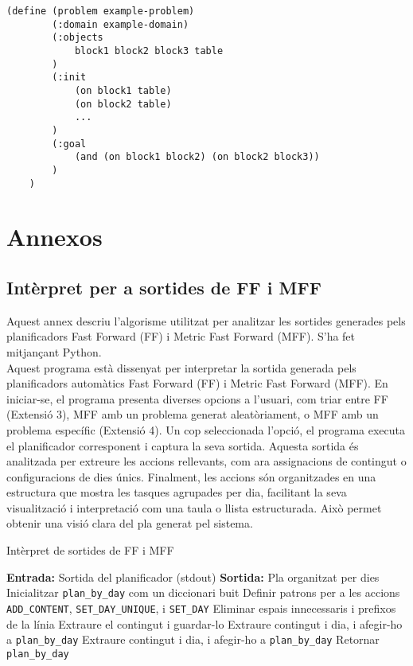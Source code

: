 \documentclass[a4paper]{article}
\begin{document}
	\begin{lstlisting}[language=PDDL, caption={Especificació del problema en PDDL}, label={lst:problemaPDDL}]
	(define (problem example-problem)
		(:domain example-domain)
		(:objects
			block1 block2 block3 table
		)
		(:init
			(on block1 table)
			(on block2 table)
			...
		)
		(:goal
			(and (on block1 block2) (on block2 block3))
		)
	)
	\end{lstlisting}
	
	\newpage
	\section{Annexos}
	
	\subsection{Intèrpret per a sortides de FF i MFF}
	
	Aquest annex descriu l'algorisme utilitzat per analitzar les sortides generades pels planificadors Fast Forward (FF) i Metric Fast Forward (MFF). S'ha fet mitjançant Python. \\
	
	Aquest programa està dissenyat per interpretar la sortida generada pels planificadors automàtics Fast Forward (FF) i Metric Fast Forward (MFF). En iniciar-se, el programa presenta diverses opcions a l'usuari, com triar entre FF (Extensió 3), MFF amb un problema generat aleatòriament, o MFF amb un problema específic (Extensió 4). Un cop seleccionada l'opció, el programa executa el planificador corresponent i captura la seva sortida. Aquesta sortida és analitzada per extreure les accions rellevants, com ara assignacions de contingut o configuracions de dies únics. Finalment, les accions són organitzades en una estructura que mostra les tasques agrupades per dia, facilitant la seva visualització i interpretació com una taula o llista estructurada. Això permet obtenir una visió clara del pla generat pel sistema.
	
	\begin{algorithm}[H]
		\caption{Intèrpret de sortides de FF i MFF}\label{alg:ffinterpreter}
		\begin{algorithmic}[1]
			\State \textbf{Entrada:} Sortida del planificador (stdout)
			\State \textbf{Sortida:} Pla organitzat per dies
			\State Inicialitzar \texttt{plan\_by\_day} com un diccionari buit
			\State Definir patrons per a les accions \texttt{ADD\_CONTENT}, \texttt{SET\_DAY\_UNIQUE}, i \texttt{SET\_DAY}
			\State Eliminar espais innecessaris i prefixos de la línia
			\State Extraure el contingut i guardar-lo
			\State Extraure contingut i dia, i afegir-ho a \texttt{plan\_by\_day}
			\State Extraure contingut i dia, i afegir-ho a \texttt{plan\_by\_day}
			\EndIf
			\EndFor
			\State Retornar \texttt{plan\_by\_day}
		\end{algorithmic}
	\end{algorithm}
	
\end{document}
